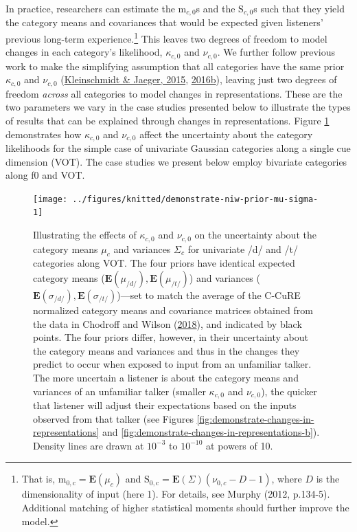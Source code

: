 \documentclass[
  11pt,
  man,floatsintext]{apa6}
\begin{document}
In practice, researchers can estimate the \(\mathrm{m}_{c,0}\)s and the \(\mathrm{S}_{c,0}\)s such that they yield the category means and covariances that would be expected given listeners' previous long-term experience.\footnote{That is, \(\mathrm{m_{0,c}} = \mathbf{E}(\mu_c)\) and \(\mathrm{S_{0,c}} = \mathbf{E}(\Sigma)(\nu_{0,c}-D-1)\), where \(D\) is the dimensionality of input (here 1). For details, see Murphy (2012, p.134-5). Additional matching of higher statistical moments should further improve the model.} This leaves two degrees of freedom to model changes in each category's likelihood, \(\kappa_{c,0}\) and \(\nu_{c,0}\). We further follow previous work to make the simplifying assumption that all categories have the same prior \(\kappa_{c,0}\) and \(\nu_{c,0}\) (\protect\hyperlink{ref-kleinschmidt-jaeger2015}{Kleinschmidt \& Jaeger, 2015}, \protect\hyperlink{ref-kleinschmidt-jaeger2016cogsci}{2016b}), leaving just two degrees of freedom \emph{across} all categories to model changes in representations. These are the two parameters we vary in the case studies presented below to illustrate the types of results that can be explained through changes in representations. Figure \ref{fig:demonstrate-niw-prior-mu-sigma} demonstrates how \(\kappa_{c,0}\) and \(\nu_{c,0}\) affect the uncertainty about the category likelihoods for the simple case of univariate Gaussian categories along a single cue dimension (VOT). The case studies we present below employ bivariate categories along f0 and VOT.



\begin{figure}

{\centering \texttt{[image: ../figures/knitted/demonstrate-niw-prior-mu-sigma-1]} 

}

\caption{Illustrating the effects of \(\kappa_{c,0}\) and \(\nu_{c,0}\) on the uncertainty about the category means \(\mu_c\) and variances \(\Sigma_c\) for univariate /d/ and /t/ categories along VOT. The four priors have identical expected category means (\(\mathbf{E}(\mu_{/d/}), \mathbf{E}(\mu_{/t/})\)) and variances (\(\mathbf{E}(\sigma_{/d/}), \mathbf{E}(\sigma_{/t/})\))---set to match the average of the C-CuRE normalized category means and covariance matrices obtained from the data in Chodroff and Wilson (\protect\hyperlink{ref-chodroff-wilson2018}{2018}), and indicated by black points. The four priors differ, however, in their uncertainty about the category means and variances and thus in the changes they predict to occur when exposed to input from an unfamiliar talker. The more uncertain a listener is about the category means and variances of an unfamiliar talker (smaller \(\kappa_{c,0}\) and \(\nu_{c,0}\)), the quicker that listener will adjust their expectations based on the inputs observed from that talker (see Figures \ref{fig:demonstrate-changes-in-representations} and \ref{fig:demonstrate-changes-in-representations-b}). Density lines are drawn at \(10^{-3}\) to \(10^{-10}\) at powers of 10.}\label{fig:demonstrate-niw-prior-mu-sigma}
\end{figure}
\end{document}

